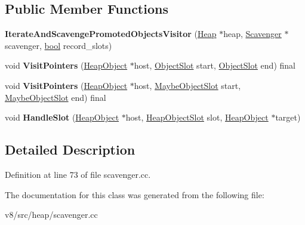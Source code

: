 \subsection*{Public Member Functions}
\begin{DoxyCompactItemize}
\item 
\mbox{\label{classv8_1_1internal_1_1IterateAndScavengePromotedObjectsVisitor_a9b230776b3af85c1b949c004c3594a89}} 
{\bfseries Iterate\+And\+Scavenge\+Promoted\+Objects\+Visitor} (\mbox{\hyperlink{classv8_1_1internal_1_1Heap}{Heap}} $\ast$heap, \mbox{\hyperlink{classv8_1_1internal_1_1Scavenger}{Scavenger}} $\ast$scavenger, \mbox{\hyperlink{classbool}{bool}} record\+\_\+slots)
\item 
\mbox{\label{classv8_1_1internal_1_1IterateAndScavengePromotedObjectsVisitor_a67806482b0522361916daf4331270459}} 
void {\bfseries Visit\+Pointers} (\mbox{\hyperlink{classv8_1_1internal_1_1HeapObject}{Heap\+Object}} $\ast$host, \mbox{\hyperlink{classv8_1_1internal_1_1ObjectSlot}{Object\+Slot}} start, \mbox{\hyperlink{classv8_1_1internal_1_1ObjectSlot}{Object\+Slot}} end) final
\item 
\mbox{\label{classv8_1_1internal_1_1IterateAndScavengePromotedObjectsVisitor_a09740fd667c4656a91edcd29313d97b5}} 
void {\bfseries Visit\+Pointers} (\mbox{\hyperlink{classv8_1_1internal_1_1HeapObject}{Heap\+Object}} $\ast$host, \mbox{\hyperlink{classv8_1_1internal_1_1MaybeObjectSlot}{Maybe\+Object\+Slot}} start, \mbox{\hyperlink{classv8_1_1internal_1_1MaybeObjectSlot}{Maybe\+Object\+Slot}} end) final
\item 
\mbox{\label{classv8_1_1internal_1_1IterateAndScavengePromotedObjectsVisitor_a20d62b0dd7624dec83a637c0efa752fa}} 
void {\bfseries Handle\+Slot} (\mbox{\hyperlink{classv8_1_1internal_1_1HeapObject}{Heap\+Object}} $\ast$host, \mbox{\hyperlink{classv8_1_1internal_1_1HeapObjectSlot}{Heap\+Object\+Slot}} slot, \mbox{\hyperlink{classv8_1_1internal_1_1HeapObject}{Heap\+Object}} $\ast$target)
\end{DoxyCompactItemize}


\subsection{Detailed Description}


Definition at line 73 of file scavenger.\+cc.



The documentation for this class was generated from the following file\+:\begin{DoxyCompactItemize}
\item 
v8/src/heap/scavenger.\+cc\end{DoxyCompactItemize}
